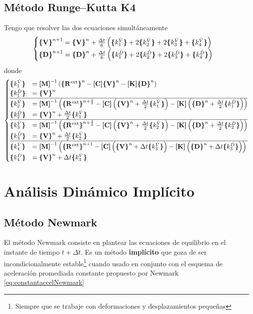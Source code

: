 \subsection*{Método Runge--Kutta K4}
Tengo que resolver las dos ecuaciones simultáneamente
\[
\begin{cases}
	\Cme{V}^{n+1}=\Cme{V}^n + \frac{\Delta t}{6} \left( \kuV + 2\kdV + 2\ktV + \kcV \right) \\
	\Cme{D}^{n+1}=\Cme{D}^n + \frac{\Delta t}{6} \left( \kuD + 2\kdD + 2\ktD + \kcD \right) \\
\end{cases}
\]
donde 
\begin{align*}
	\begin{cases}
	\kuV &= \Mme{M}^{-1} \left( \Cme{R^{\mathrm{ext}}}^n - \MC \Cme{V}^n - \MK \Cme{D}^n  \right) \\
	\kuD &= \Cme{V}^n \\\hline
	\kdV &= \Mme{M}^{-1} \left( \Cme{R^{\mathrm{ext}}}^{n+\frac{1}{2}} - \MC \left(\Cme{V}^n + \frac{\Delta t}{2} \kuV \right) - \MK \left( \Cme{D}^n + \frac{\Delta t}{2} \kuD \right)  \right) \\
	\kdD &= \Cme{V}^n + \frac{\Delta t}{2} \kuV \\	\hline
	\ktV &= \Mme{M}^{-1} \left( \Cme{R^{\mathrm{ext}}}^{n+\frac{1}{2}} - \MC \left(\Cme{V}^n + \frac{\Delta t}{2} \kdV \right) - \MK \left( \Cme{D}^n + \frac{\Delta t}{2} \kdD \right)  \right) \\
	\ktD &= \Cme{V}^n + \frac{\Delta t}{2} \kdV \\	\hline
	\kcV &= \Mme{M}^{-1} \left( \Cme{R^{\mathrm{ext}}}^{n+1} - \MC \left(\Cme{V}^n + \Delta t \ktV \right) - \MK \left( \Cme{D}^n + \Delta t \ktD \right)  \right) \\
	\kcD &= \Cme{V}^n + \Delta t \ktV
	\end{cases}
\end{align*}

\section{Análisis Dinámico Implícito}

\subsection*{Método Newmark }
El método Newmark consiste en plantear las ecuaciones de equilibrio en el instante de tiempo \(t+\Delta t\). Es un método \textbf{implícito} que goza de ser incondicionalmente estable\footnote{Siempre que se trabaje con deformaciones y desplazamientos pequeñas} cuando usado en conjunto con el esquema de aceleración promediada constante  propuesto por Newmark \eqref{eq:constantaccelNewmark}


